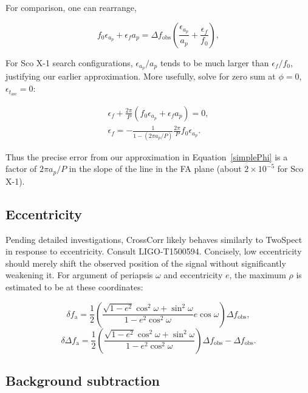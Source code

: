 \documentclass{article}
\begin{document}
\noindent For comparison, one can rearrange,


\begin{equation}
f_0 \epsilon_{a_p} + \epsilon_f a_p = \Delta f_\mathrm{obs}\left(\frac{\epsilon_{a_p}}{a_p} + \frac{\epsilon_f}{f_0} \right),
\end{equation}

\noindent
For Sco X-1 search configurations, $\epsilon_{a_p}/a_p$ tends to be much larger than $\epsilon_f /f_0$, justifying our earlier approximation.
More usefully, solve for zero sum at $\phi=0$, $\epsilon_{t_\mathrm{asc}} =0$:


\begin{eqnarray}
\epsilon_f + \frac{2\pi}{P} (f_0 \epsilon_{a_p} + \epsilon_f a_p) = 0,\\
\epsilon_f = -\frac{1}{1 - (2\pi a_p/P)} \frac{2\pi}{P} f_0 \epsilon_{a_p}.
\end{eqnarray}

\noindent Thus the precise error from our approximation in Equation~\ref{simplePhi} is a factor of $2 \pi a_p /P$ in the slope of the line in the FA plane (about $2\times 10^{-5}$ for Sco X-1).

\subsection{Eccentricity}

Pending detailed investigations, CrossCorr likely behaves similarly to TwoSpect in response to eccentricity.
Consult LIGO-T1500594.
Concisely, low eccentricity should merely shift the observed position of the signal without significantly weakening it.
For argument of periapsis $\omega$ and eccentricity $e$,
the maximum $\rho$ is estimated to be at these coordinates:

\begin{equation}
\delta f_\mathrm{a} = \frac{1}{2} \left( \frac{\sqrt{1-e^2} \cos^2 \omega + \sin^2 \omega}{1-e^2 \cos^2 \omega} e \cos \omega \right) \Delta f_\mathrm{obs},
\label{solved_dfa}
\end{equation}
\begin{equation}
\delta \Delta f_\mathrm{a} = \frac{1}{2} \left( \frac{\sqrt{1-e^2} \cos^2 \omega + \sin^2 \omega}{1-e^2 \cos^2 \omega} \right)  \Delta f_\mathrm{obs} - \Delta f_\mathrm{obs}.
\label{solved_ddfa}
\end{equation}



\subsection{Background subtraction}
\end{document}
